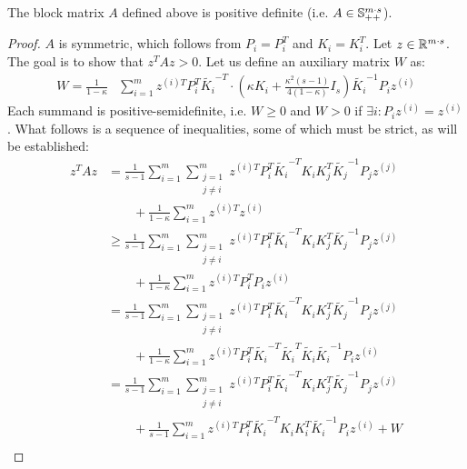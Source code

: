 \begin{lemma}
The block matrix $A$ defined above is positive definite (i.e. $A \in \mathbb{S}_{++}^{m\cdot s}$).
\end{lemma}
\begin{proof}
$A$ is symmetric, which follows from $P_i = P_i^T$ and $K_i =
K_i^T$. Let $z \in \mathbb{R}^{m\cdot s}$.  The goal is to show that $z^T A z > 0$.
Let us define an auxiliary matrix $W$ as:
\begin{equation*}
\begin{aligned}
W =  \frac{1}{1- \kappa }&\sum_{i = 1}^m z^{(i)T} P_i^T
\widetilde{K_i}^{-T} \cdot \left( \kappa K_i + \frac{\kappa^2
    \left(s-1\right)}{4\left(1-\kappa\right)}I_s   \right)
\widetilde{K_i}^{-1} P_i z^{(i)}
\end{aligned}
\end{equation*}
Each summand is positive-semidefinite, i.e. $W \geq 0$ and $W > 0$ if $\exists i: P_i z^{(i)} = z^{(i)}$.
What follows is a sequence of inequalities, some of which must be strict, as will be established:
\begin{align}
z^T A z &=  \frac{1}{s -1} \sum_{i = 1}^m \sum_{\substack{j = 1\\j\neq i}}^m z^{(i)T} P_i^T \widetilde{K_i}^{-T} K_i K_j^T \widetilde{K_j}^{-1} P_j z^{(j)}\nonumber
\\& \qquad + \frac{1}{1- \kappa }\sum_{i = 1}^m z^{(i)T}  z^{(i)} \label{proof_line_1}\\
%
&\geq \frac{1}{s -1} \sum_{i = 1}^m \sum_{\substack{j = 1\\ j\neq i}}^m z^{(i)T} P_i^T \widetilde{K_i}^{-T} K_i K_j^T \widetilde{K_j}^{-1} P_j z^{(j)}\nonumber\\
& \qquad + \frac{1}{1- \kappa }\sum_{i = 1}^m z^{(i)T} P_i^T P_i z^{(i)}  \label{proof_line_2}\\
%
 &= \frac{1}{s -1} \sum_{i = 1}^m \sum_{\substack{j = 1\\ j\neq i}}^m z^{(i)T} P_i^T \widetilde{K_i}^{-T} K_i K_j^T \widetilde{K_j}^{-1} P_j z^{(j)}\nonumber\\
 & \qquad+ \frac{1}{1- \kappa }\sum_{i = 1}^m z^{(i)T} P_i^T \widetilde{K_i}^{-T}  \widetilde{K_i}^T \widetilde{K_i} \widetilde{K_i}^{-1} P_i z^{(i)}  \label{proof_line_3}\\
%
&= \frac{1}{s -1} \sum_{i = 1}^m \sum_{\substack{j = 1\\ j\neq i}}^m z^{(i)T} P_i^T \widetilde{K_i}^{-T} K_i K_j^T \widetilde{K_j}^{-1} P_j z^{(j)}\nonumber
\\& \qquad+ \frac{1}{s-1}\sum_{i = 1}^m z^{(i)T} P_i^T \widetilde{K_i}^{-T}  K_i K_i^T \widetilde{K_i}^{-1} P_i z^{(i)} + W  \label{proof_line_4}\\

\end{align}
\end{proof}
